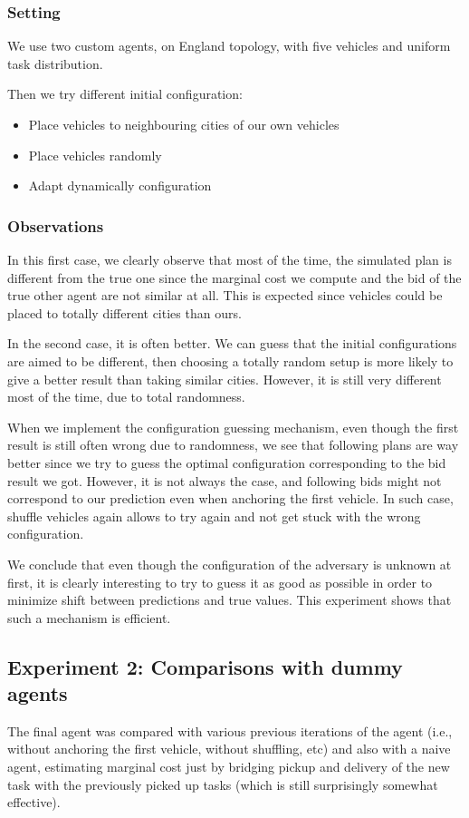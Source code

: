 \documentclass[11pt]{article}
\begin{document}
\subsubsection{Setting}
We use two custom agents, on England topology, with five vehicles and uniform task distribution.

Then we try different initial configuration:
\begin{itemize}
	\item Place vehicles to neighbouring cities of our own vehicles
	\item Place vehicles randomly
	\item Adapt dynamically configuration
\end{itemize}

\subsubsection{Observations}

In this first case, we clearly observe that most of the time, the simulated plan is different from the true one since the marginal cost we compute and the bid of the true other agent are not similar at all. This is expected since vehicles could be placed to totally different cities than ours.

In the second case, it is often better. We can guess that the initial configurations are aimed to be different, then choosing a totally random setup is more likely to give a better result than taking similar cities. However, it is still very different most of the time, due to total randomness.

When we implement the configuration guessing mechanism, even though the first result is still often wrong due to randomness, we see that following plans are way better since we try to guess the optimal configuration corresponding to the bid result we got. However, it is not always the case, and following bids might not correspond to our prediction even when anchoring the first vehicle. In such case, shuffle vehicles again allows to try again and not get stuck with the wrong configuration.

We conclude that even though the configuration of the adversary is unknown at first, it is clearly interesting to try to guess it as good as possible in order to minimize shift between predictions and true values. This experiment shows that such a mechanism is efficient.


\subsection{Experiment 2: Comparisons with dummy agents}
The final agent was compared with various previous iterations of the agent (i.e., without anchoring the first vehicle, without shuffling, etc) and also with a naive agent, estimating marginal cost just by bridging pickup and delivery of the new task with the previously picked up tasks (which is still surprisingly somewhat effective).
\end{document}
